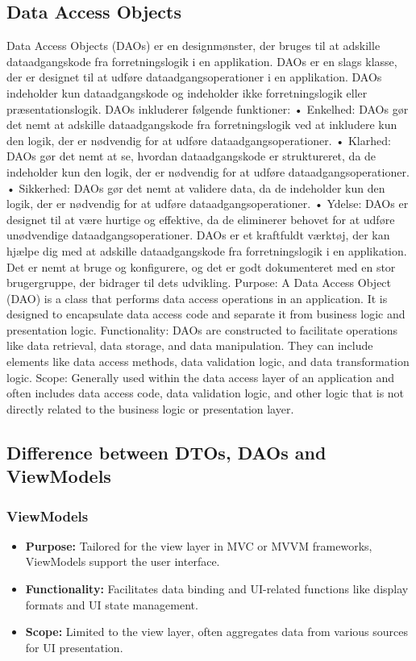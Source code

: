 \subsection{Data Access Objects}
Data Access Objects (DAOs) er en designmønster, der bruges til at adskille dataadgangskode fra forretningslogik i en applikation. DAOs er en slags klasse, der er designet til at udføre dataadgangsoperationer i en applikation. DAOs indeholder kun dataadgangskode og indeholder ikke forretningslogik eller præsentationslogik.
DAOs inkluderer følgende funktioner:
•	Enkelhed: DAOs gør det nemt at adskille dataadgangskode fra forretningslogik ved at inkludere kun den logik, der er nødvendig for at udføre dataadgangsoperationer.
•	Klarhed: DAOs gør det nemt at se, hvordan dataadgangskode er struktureret, da de indeholder kun den logik, der er nødvendig for at udføre dataadgangsoperationer.
•	Sikkerhed: DAOs gør det nemt at validere data, da de indeholder kun den logik, der er nødvendig for at udføre dataadgangsoperationer.
•	Ydelse: DAOs er designet til at være hurtige og effektive, da de eliminerer behovet for at udføre unødvendige dataadgangsoperationer.
DAOs er et kraftfuldt værktøj, der kan hjælpe dig med at adskille dataadgangskode fra forretningslogik i en applikation. Det er nemt at bruge og konfigurere, og det er godt dokumenteret med en stor brugergruppe, der bidrager til dets udvikling.
Purpose: A Data Access Object (DAO) is a class that performs data access operations in an application. It is designed to encapsulate data access code and separate it from business logic and presentation logic.
Functionality: DAOs are constructed to facilitate operations like data retrieval, data storage, and data manipulation. They can include elements like data access methods, data validation logic, and data transformation logic.
Scope: Generally used within the data access layer of an application and often includes data access code, data validation logic, and other logic that is not directly related to the business logic or presentation layer.

\subsection{Difference between DTOs, DAOs and ViewModels}

\subsubsection{ViewModels}
\begin{itemize}
    \item \textbf{Purpose:} Tailored for the view layer in MVC or MVVM frameworks, ViewModels support the user interface.
    \item \textbf{Functionality:} Facilitates data binding and UI-related functions like display formats and UI state management.
    \item \textbf{Scope:} Limited to the view layer, often aggregates data from various sources for UI presentation.
\end{itemize}

